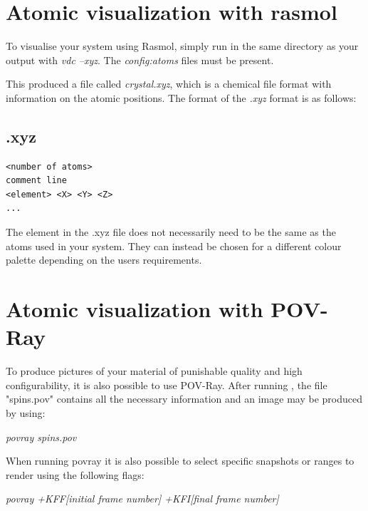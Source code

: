 \section*{Atomic visualization with rasmol}

To visualise your system using Rasmol, simply run \vdc in the same directory as your output with \textit{vdc --xyz}. The \textit{config:atoms} files must be present.

This produced a file called \textit{crystal.xyz}, which is a chemical file format with information on the atomic positions. The format of the \textit{.xyz} format is as follows:

\subsection*{.xyz}
{\footnotesize
\begin{verbatim}
<number of atoms>
comment line
<element> <X> <Y> <Z>
...
\end{verbatim}
}

The element in the .xyz file does not necessarily need to be the same as the atoms used in your system. They can instead be chosen for a different colour palette depending on the users requirements.

\section*{Atomic visualization with POV-Ray}

To produce pictures of your material of punishable quality and high configurability, it is also possible to use POV-Ray. After running \vdc, the file "spins.pov" contains all the necessary information and an image may be produced by using:

\noindent
\begin{minipage}[c]{\textwidth}
\centering
\textit{povray spins.pov}
\end{minipage}

When running povray it is also possible to select specific snapshots or ranges to render using the following flags:

\noindent
\begin{minipage}[c]{\textwidth}
\centering
\textit{povray +KFF[initial frame number] +KFI[final frame number]}
\end{minipage}

